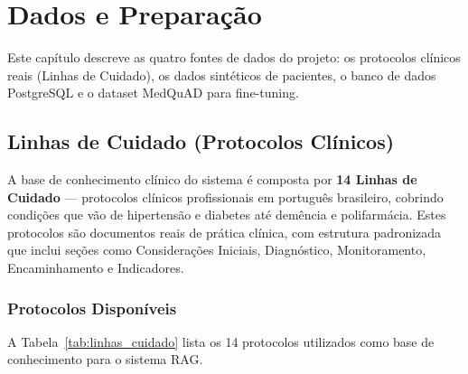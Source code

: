 
\chapter{Dados e Preparação}\label{cap:dados}

Este capítulo descreve as quatro fontes de dados do projeto: os protocolos clínicos reais (Linhas de Cuidado), os dados sintéticos de pacientes, o banco de dados PostgreSQL e o dataset MedQuAD para fine-tuning.

\section{Linhas de Cuidado (Protocolos Clínicos)}

A base de conhecimento clínico do sistema é composta por \textbf{14 Linhas de Cuidado} --- protocolos clínicos profissionais em português brasileiro, cobrindo condições que vão de hipertensão e diabetes até demência e polifarmácia. Estes protocolos são documentos reais de prática clínica, com estrutura padronizada que inclui seções como Considerações Iniciais, Diagnóstico, Monitoramento, Encaminhamento e Indicadores.

\subsection{Protocolos Disponíveis}

A Tabela~\ref{tab:linhas_cuidado} lista os 14 protocolos utilizados como base de conhecimento para o sistema RAG.


